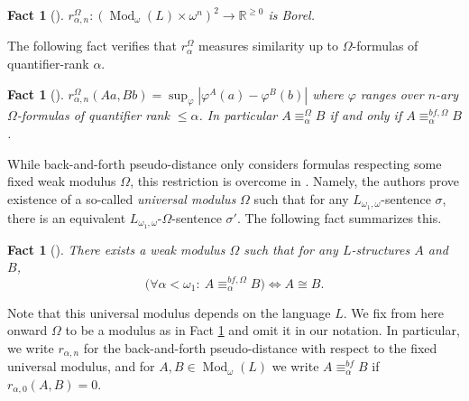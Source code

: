 \documentclass[12pt]{amsart}
\newtheorem{fact}[theorem]{Fact}
\DeclareMathOperator{\Mod}{Mod}
\begin{document}
\begin{fact}[{\cite[Proposition 4.3]{yaacov2017metric}}] \label{fact: pseudo bnf distance is Borel}
    $r_{\alpha,n}^{\Omega} \colon {(\Mod_\omega(L)\times\omega^n)}^2\to\mathbb R^{\geq 0}$ is Borel.
\end{fact}

The following fact verifies that $r_\alpha^\Omega$ measures similarity up to $\Omega$-formulas of quantifier-rank $\alpha$.

\begin{fact}[{\cite[Theorem 3.5]{yaacov2017metric}}] \label{fact: bnf pseudo-metric properties}
    $r_{\alpha,n}^{\Omega}(Aa,Bb)=\sup_\varphi|\varphi^{{A}}(a)-\varphi^{B}(b)|$ where $\varphi$ ranges over $n$-ary $\Omega$-formulas of quantifier rank $\leq \alpha$. In particular $A\equiv_\alpha^\Omega B$ if and only if $A\equiv_\alpha^{bf,\Omega}B$.
\end{fact}

While back-and-forth pseudo-distance only considers formulas respecting some fixed weak modulus $\Omega$, this restriction is overcome in \cite[Chapter 5]{yaacov2017metric}. Namely, the authors prove existence of a so-called \textit{universal modulus} $\Omega$ such that for any $L_{\omega_1, \omega}$-sentence $\sigma$, there is an equivalent $L_{\omega_1,\omega}$-$\Omega$-sentence $\sigma'$. The following fact summarizes this.

\begin{fact}[{\cite[Section 5]{yaacov2017metric}}]\label{fact: universal modlus}
    There exists a weak modulus $\Omega$ such that for any $L$-structures $A$ and $B$,
    \[\big(\forall \alpha<\omega_1:~A\equiv_\alpha^{bf,\Omega} B\big) \iff A\cong B.\]
\end{fact}

Note that this universal modulus depends on the language $L$. We fix from here onward $\Omega$ to be a modulus as in Fact \ref{fact: universal modlus} and omit it in our notation. In particular, we write $r_{\alpha,n}$ for the back-and-forth pseudo-distance with respect to the fixed universal modulus, and for $A,B\in\Mod_\omega(L)$ we write $A\equiv_\alpha^{bf}B$ if $r_{\alpha,0}(A,B)=0$. 
\end{document}
